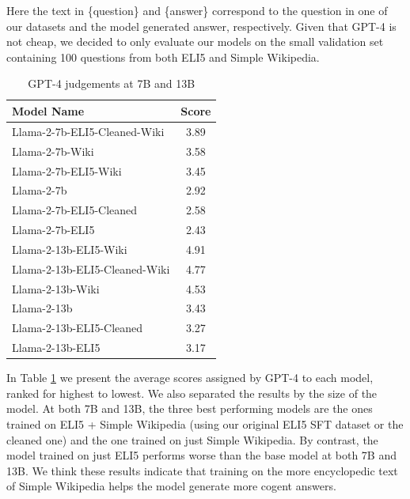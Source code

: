 \documentclass[11pt, oneside]{article}   	%
\begin{document}
Here the text in \{question\} and \{answer\} correspond to the question in one of our datasets and the model generated answer, respectively.
Given that GPT-4 is not cheap, we decided to only evaluate our models on the small validation set containing 100 questions from both ELI5 and Simple Wikipedia.

\begin{table}[h]
\centering
\begin{tabular}{|l|c|}
\hline
Model Name & Score \\
\hline
Llama-2-7b-ELI5-Cleaned-Wiki & 3.89 \\
Llama-2-7b-Wiki & 3.58 \\
Llama-2-7b-ELI5-Wiki & 3.45 \\
Llama-2-7b & 2.92 \\
Llama-2-7b-ELI5-Cleaned & 2.58 \\
Llama-2-7b-ELI5 & 2.43 \\
\hline\hline 
Llama-2-13b-ELI5-Wiki & 4.91 \\
Llama-2-13b-ELI5-Cleaned-Wiki & 4.77 \\
Llama-2-13b-Wiki & 4.53 \\
Llama-2-13b & 3.43 \\
Llama-2-13b-ELI5-Cleaned & 3.27 \\
Llama-2-13b-ELI5 & 3.17 \\
\hline
\end{tabular}
\caption{GPT-4 judgements at 7B and 13B}
\label{tab:GPT4-judgements}
\end{table}
  
In Table \ref{tab:GPT4-judgements} we present the average scores assigned by GPT-4 to each model, ranked for highest to lowest.
We also separated the results by the size of the model.
At both 7B and 13B, the three best performing models are the ones trained on ELI5 + Simple Wikipedia (using our original ELI5 SFT dataset or the cleaned one) and the one trained on just Simple Wikipedia.
By contrast, the model trained on just ELI5 performs worse than the base model at both 7B and 13B.
We think these results indicate that training on the more encyclopedic text of Simple Wikipedia helps the model generate more cogent answers.
\end{document}
